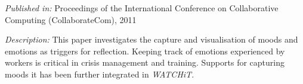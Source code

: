 \emph{Published in: }Proceedings of the International Conference on Collaborative Computing (CollaborateCom), 2011

\emph{Description: }This paper investigates the capture and visualisation of moods and emotions as triggers for reflection. Keeping track of emotions experienced by workers is critical in crisis management and training. Supports for capturing moods it has been further integrated in \emph{WATCHiT}.


